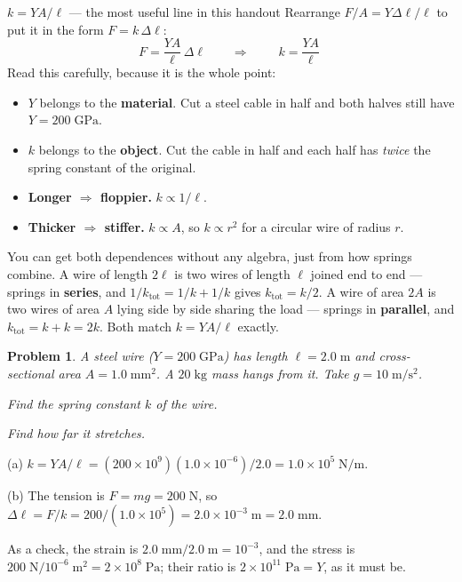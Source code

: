 \documentclass[11pt]{article}
\newcommand{\clearpts}{\addtocounter{tpts}{\value{cpts}} \setcounter{cpts}{0}}
\newcommand{\pts}[1]{\clearpts \setcounter{cpts}{#1}}
\theoremstyle{mystyle}
\newtheorem{pproblem}{Problem}
\begin{document}
\begin{psidea}{$k = YA/\ell$ --- the most useful line in this handout}{}
Rearrange $F/A = Y \Delta\ell/\ell$ to put it in the form $F = k\,\Delta\ell$:
\[
F = \frac{YA}{\ell}\,\Delta \ell
\qquad\Longrightarrow\qquad
\boxed{\;k = \frac{YA}{\ell}\;}
\]
Read this carefully, because it is the whole point:
\begin{itemize}
\item[$\bullet$] $Y$ belongs to the \textbf{material}. Cut a steel cable in half and both
halves still have $Y = 200\;\mathrm{GPa}$.
\item[$\bullet$] $k$ belongs to the \textbf{object}. Cut the cable in half and each half
has \emph{twice} the spring constant of the original.
\item[$\bullet$] \textbf{Longer $\Rightarrow$ floppier.} $k \propto 1/\ell$.
\item[$\bullet$] \textbf{Thicker $\Rightarrow$ stiffer.} $k \propto A$, so $k \propto r^2$
for a circular wire of radius $r$.
\end{itemize}
\end{psidea}

\begin{psremark*}{}{}
You can get both dependences without any algebra, just from how springs combine. A wire
of length $2\ell$ is two wires of length $\ell$ joined end to end --- springs in
\textbf{series}, and $1/k_{\text{tot}} = 1/k + 1/k$ gives $k_{\text{tot}} = k/2$. A wire
of area $2A$ is two wires of area $A$ lying side by side sharing the load --- springs in
\textbf{parallel}, and $k_{\text{tot}} = k + k = 2k$. Both match $k = YA/\ell$ exactly.
\end{psremark*}

\pts{4}
\begin{pproblem}
A steel wire ($Y = 200\;\mathrm{GPa}$) has length $\ell = 2.0\;\mathrm{m}$ and
cross-sectional area $A = 1.0\;\mathrm{mm}^2$. A $20\;\mathrm{kg}$ mass hangs from it.
Take $g = 10\;\mathrm{m/s^2}$.
\begin{subpart}
\item Find the spring constant $k$ of the wire.
\item Find how far it stretches.
\end{subpart}
\end{pproblem}
\begin{solution}
(a) $k = YA/\ell = (200\times10^{9})(1.0\times10^{-6})/2.0 = 1.0\times 10^{5}\;
\mathrm{N/m}$.

(b) The tension is $F = mg = 200\;\mathrm{N}$, so
$\Delta \ell = F/k = 200/(1.0\times10^{5}) = 2.0\times 10^{-3}\;\mathrm{m}
= 2.0\;\mathrm{mm}$.

As a check, the strain is $2.0\;\mathrm{mm}/2.0\;\mathrm{m} = 10^{-3}$, and the stress is
$200\;\mathrm{N}/10^{-6}\;\mathrm{m}^2 = 2\times10^{8}\;\mathrm{Pa}$; their ratio is
$2\times 10^{11}\;\mathrm{Pa} = Y$, as it must be.
\end{solution}
\end{document}
